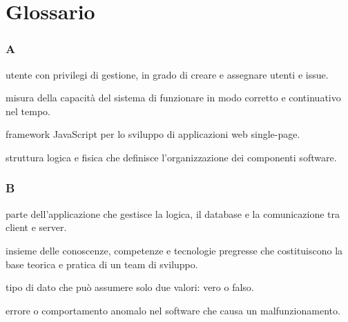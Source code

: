 \chapter{Glossario}
\subsection*{A}
\begin{description}[leftmargin=2cm, labelindent=1cm]
    \item [Admin] utente con privilegi di gestione, in grado di creare e assegnare utenti e issue.
  \item[Affidabilità] misura della capacità del sistema di funzionare in modo corretto e continuativo nel tempo.
  \item[Angular] framework JavaScript per lo sviluppo di applicazioni web single-page.
  \item[Architettura] struttura logica e fisica che definisce l'organizzazione dei componenti software.
\end{description}

\subsection*{B}
\begin{description}[leftmargin=2cm, labelindent=1cm]
  \item[Backend] parte dell'applicazione che gestisce la logica, il database e la comunicazione tra client e server.
  \item[Background tecnico] insieme delle conoscenze, competenze e tecnologie pregresse che costituiscono la base teorica e pratica di un team di sviluppo.
  \item[Boolean] tipo di dato che può assumere solo due valori: vero o falso.
  \item[Bug] errore o comportamento anomalo nel software che causa un malfunzionamento.
\end{description}

